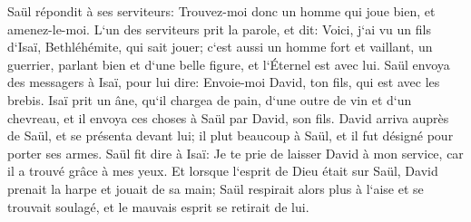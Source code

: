 \verse Saül répondit à ses serviteurs: Trouvez-moi donc un homme qui joue bien, et amenez-le-moi. 
\verse L`un des serviteurs prit la parole, et dit: Voici, j`ai vu un fils d`Isaï, Bethléhémite, qui sait jouer; c`est aussi un homme fort et vaillant, un guerrier, parlant bien et d`une belle figure, et l`Éternel est avec lui. 
\verse Saül envoya des messagers à Isaï, pour lui dire: Envoie-moi David, ton fils, qui est avec les brebis. 
\verse Isaï prit un âne, qu`il chargea de pain, d`une outre de vin et d`un chevreau, et il envoya ces choses à Saül par David, son fils. 
\verse David arriva auprès de Saül, et se présenta devant lui; il plut beaucoup à Saül, et il fut désigné pour porter ses armes. 
\verse Saül fit dire à Isaï: Je te prie de laisser David à mon service, car il a trouvé grâce à mes yeux. 
\verse Et lorsque l`esprit de Dieu était sur Saül, David prenait la harpe et jouait de sa main; Saül respirait alors plus à l`aise et se trouvait soulagé, et le mauvais esprit se retirait de lui. 

